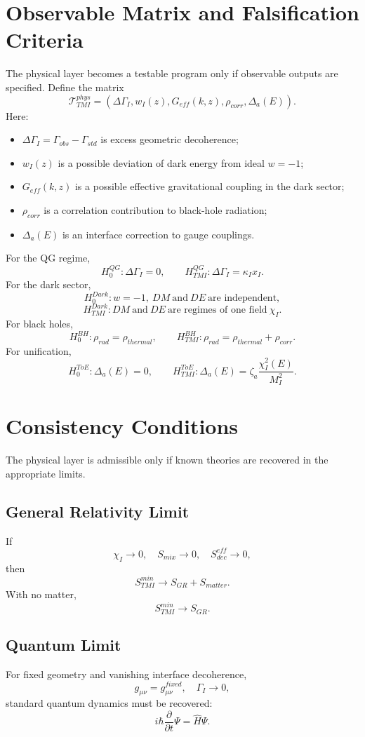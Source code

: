 \documentclass[12pt,a4paper]{article}
\begin{document}
\section{Observable Matrix and Falsification Criteria}
The physical layer becomes a testable program only if observable outputs are specified. Define the matrix
\[
\boxed{
\mathcal T_{TMI}^{phys}=\left(\Delta\Gamma_I,
 w_I(z),G_{eff}(k,z),\rho_{corr},\Delta_a(E)\right).
}
\]
Here:
\begin{itemize}[leftmargin=2em]
\item $\Delta\Gamma_I=\Gamma_{obs}-\Gamma_{std}$ is excess geometric decoherence;
\item $w_I(z)$ is a possible deviation of dark energy from ideal $w=-1$;
\item $G_{eff}(k,z)$ is a possible effective gravitational coupling in the dark sector;
\item $\rho_{corr}$ is a correlation contribution to black-hole radiation;
\item $\Delta_a(E)$ is an interface correction to gauge couplings.
\end{itemize}

For the QG regime,
\[
\boxed{H_0^{QG}:\Delta\Gamma_I=0,}
\qquad
\boxed{H_{TMI}^{QG}:\Delta\Gamma_I=\kappa_Ix_I.}
\]
For the dark sector,
\[
\boxed{H_0^{Dark}:w=-1,\ DM\ \text{and}\ DE\ \text{are independent},}
\]
\[
\boxed{H_{TMI}^{Dark}:DM\ \text{and}\ DE\ \text{are regimes of one field}\ \chi_I.}
\]
For black holes,
\[
\boxed{H_0^{BH}:\rho_{rad}=\rho_{thermal},}
\qquad
\boxed{H_{TMI}^{BH}:\rho_{rad}=\rho_{thermal}+\rho_{corr}.}
\]
For unification,
\[
\boxed{H_0^{ToE}:\Delta_a(E)=0,}
\qquad
\boxed{H_{TMI}^{ToE}:\Delta_a(E)=\zeta_a\frac{\chi_I^2(E)}{M_I^2}.}
\]

\section{Consistency Conditions}
The physical layer is admissible only if known theories are recovered in the appropriate limits.

\subsection{General Relativity Limit}
If
\[
\boxed{\chi_I\to0,
\quad S_{mix}\to0,
\quad S_{dec}^{eff}\to0,}
\]
then
\[
\boxed{S_{TMI}^{min}\to S_{GR}+S_{matter}.}
\]
With no matter,
\[
\boxed{S_{TMI}^{min}\to S_{GR}.}
\]

\subsection{Quantum Limit}
For fixed geometry and vanishing interface decoherence,
\[
\boxed{g_{\mu\nu}=g_{\mu\nu}^{fixed},\quad\Gamma_I\to0,}
\]
standard quantum dynamics must be recovered:
\[
\boxed{i\hbar\frac{\partial}{\partial t}\Psi=\widehat H\Psi.}
\]
\end{document}

